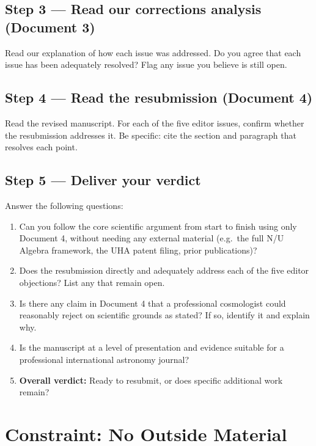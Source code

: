\documentclass[12pt,a4paper]{article}
\begin{document}
\subsection*{Step 3 — Read our corrections analysis (Document 3)}
Read our explanation of how each issue was addressed.
Do you agree that each issue has been adequately resolved?
Flag any issue you believe is still open.

\subsection*{Step 4 — Read the resubmission (Document 4)}
Read the revised manuscript. For each of the five editor issues,
confirm whether the resubmission addresses it. Be specific:
cite the section and paragraph that resolves each point.

\subsection*{Step 5 — Deliver your verdict}

Answer the following questions:

\begin{enumerate}
    \item Can you follow the core scientific argument from start to
    finish using only Document 4, without needing any external
    material (e.g.\ the full N/U Algebra framework, the UHA patent
    filing, prior publications)?

    \item Does the resubmission directly and adequately address
    each of the five editor objections? List any that remain open.

    \item Is there any claim in Document 4 that a professional
    cosmologist could reasonably reject on scientific grounds
    as stated? If so, identify it and explain why.

    \item Is the manuscript at a level of presentation and
    evidence suitable for a professional international
    astronomy journal?

    \item \textbf{Overall verdict:} Ready to resubmit, or does
    specific additional work remain?
\end{enumerate}

\section*{Constraint: No Outside Material}
\end{document}

